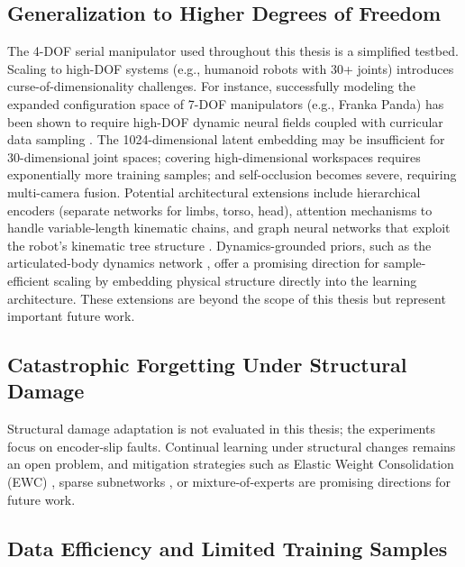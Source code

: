 \documentclass[12pt,a4paper,oneside]{report}
\begin{document}
\subsection{Generalization to Higher Degrees of Freedom}
\label{subsec:generalization_to_higher_degrees_of_freedom}

The 4-DOF serial manipulator used throughout this thesis is a simplified testbed. Scaling to high-DOF systems (e.g., humanoid robots with 30+ joints) introduces curse-of-dimensionality challenges. For instance, successfully modeling the expanded configuration space of 7-DOF manipulators (e.g., Franka Panda) has been shown to require high-DOF dynamic neural fields coupled with curricular data sampling \cite{schulze2024high}. The 1024-dimensional latent embedding may be insufficient for 30-dimensional joint spaces; covering high-dimensional workspaces requires exponentially more training samples; and self-occlusion becomes severe, requiring multi-camera fusion. Potential architectural extensions include hierarchical encoders (separate networks for limbs, torso, head), attention mechanisms to handle variable-length kinematic chains, and graph neural networks that exploit the robot's kinematic tree structure \cite{patel2024getzero}. Dynamics-grounded priors, such as the articulated-body dynamics network \cite{rajeswaran2025embodiedynamics}, offer a promising direction for sample-efficient scaling by embedding physical structure directly into the learning architecture. These extensions are beyond the scope of this thesis but represent important future work.

\subsection{Catastrophic Forgetting Under Structural Damage}
\label{subsec:catastrophic_forgetting_under_structural_damage}

Structural damage adaptation is not evaluated in this thesis; the experiments focus on encoder-slip faults. Continual learning under structural changes remains an open problem, and mitigation strategies such as Elastic Weight Consolidation (EWC) \cite{kirkpatrick2017overcoming}, sparse subnetworks \cite{frankle2018lottery}, or mixture-of-experts \cite{mocanu2018scalable} are promising directions for future work.

\subsection{Data Efficiency and Limited Training Samples}
\label{subsec:data_efficiency_and_limited_training_samples}
\end{document}
